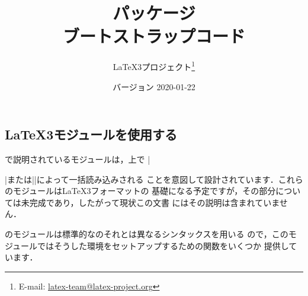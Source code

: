 \documentclass[uplatex,dvipdfmx,full,kernel]{wtpl3doc}
\begin{document}
\title{パッケージ\\ ブートストラップコード}
\author{%
 \LaTeX3プロジェクト\thanks
   {%
     E-mail:
       \href{mailto:latex-team@latex-project.org}
         {latex-team@latex-project.org}%
   }%
}
\date{バージョン 2020-01-22}

\maketitle

\begin{documentation}

\section{\LaTeX3モジュールを使用する}

で説明されているモジュールは，\LaTeXe 上で
|\usepackage{expl3}|または|\RequirePackage{expl3}|によって一括読み込みされる
ことを意図して設計されています．これらのモジュールは\LaTeX3フォーマットの
基礎になる予定ですが，その部分については未完成であり，したがって現状この文書
にはその説明は含まれていません．

のモジュールは標準的な\LaTeXe のそれとは異なるシンタックスを用いる
ので，このモジュールではそうした環境をセットアップするための関数をいくつか
提供しています．


\end{documentation}
\end{document}

